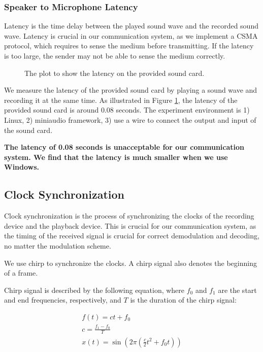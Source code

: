 \documentclass{article}
\begin{document}
\subsubsection{Speaker to Microphone Latency}

Latency is the time delay between the played sound wave and the recorded sound wave.
Latency is crucial in our communication system, as we implement a CSMA protocol, which requires to sense the medium before transmitting. If the latency is too large, the sender may not be able to sense the medium correctly.

\begin{figure}[H]
    \noindent\makebox[\textwidth]{}
    \caption{The plot to show the latency on the provided sound card.}
    \label{fig:lat}
\end{figure}

We measure the latency of the provided sound card by playing a sound wave and recording it at the same time. As illustrated in Figure \ref{fig:lat}, the latency of the provided sound card is around \(0.08\) seconds.
The experiment environment is 1) Linux, 2) miniaudio framework, 3) use a wire to connect the output and input of the sound card.

\textbf{The latency of 0.08 seconds is unacceptable for our communication system. We find that the latency is much smaller when we use Windows.}

\subsection{Clock Synchronization}

Clock synchronization is the process of synchronizing the clocks of the recording device and the playback device.
This is crucial for our communication system, as the timing of the received signal is crucial for correct demodulation and decoding, no matter the modulation scheme.

We use chirp to synchronize the clocks.
A chirp signal also denotes the beginning of a frame.

Chirp signal is described by the following equation, where \(f_0\) and \(f_1\) are the start and end frequencies, respectively, and \(T\) is the duration of the chirp signal:

\begin{gather*}
    f(t) = ct+f_0\\
    c=\frac{f_1-f_0}{T}\\
    x(t)=\sin\left(2\pi \left(\frac{c}{2}t^2 + f_0 t\right)\right)
\end{gather*}
\end{document}
